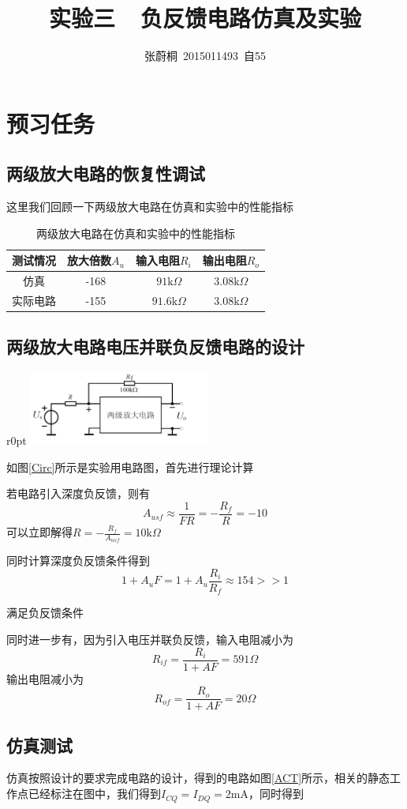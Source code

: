 \documentclass[UTF8,a4paper]{ctexart}
\title{实验三\ \ 负反馈电路仿真及实验}
\author{张蔚桐\ 2015011493\ 自55}
\begin{document}
\maketitle
\section{预习任务}
\subsection{两级放大电路的恢复性调试}
这里我们回顾一下两级放大电路在仿真和实验中的性能指标

\begin{table}
\centering
\caption{两级放大电路在仿真和实验中的性能指标}
\begin{tabular}{|c|c|c|c|}
\hline 
测试情况 & 放大倍数$A_u$ & 输入电阻$R_i$ & 输出电阻$R_o$\\
\hline 
仿真 & -168 &　$91\mathrm{k}\Omega$ & $3.08\mathrm{k}\Omega$ \\
\hline 
实际电路 & -155 &　$91.6\mathrm{k}\Omega$ & $3.08\mathrm{k}\Omega$ \\
\hline 
\end{tabular}
\end{table}
\subsection{两级放大电路电压并联负反馈电路的设计}
\begin {wrapfigure}{r}{0pt}
\includegraphics [width=60mm]{circuit.png}
\caption{实验用电路图}
\label{Circ}
\end {wrapfigure}
如图\ref{Circ}所示是实验用电路图，首先进行理论计算

若电路引入深度负反馈，则有
$$ A_{usf}\approx \frac{1}{FR}=-\frac{R_f}{R}=-10$$
可以立即解得$R=-\frac{R_f}{A_{usf}}=10\mathrm{k}\Omega$

同时计算深度负反馈条件得到
$$1+A_uF=1+A_u\frac{R_i}{R_f}\approx154 >>1$$

满足负反馈条件

同时进一步有，因为引入电压并联负反馈，输入电阻减小为
$$R_{if}=\frac{R_i}{1+AF}=591\Omega$$
输出电阻减小为
$$R_{of}=\frac{R_o}{1+AF}=20\Omega$$
\subsection{仿真测试}
仿真按照设计的要求完成电路的设计，得到的电路如图\ref{ACT}所示，相关的静态工作点已经标注在图中，我们得到$I_{CQ}=I_{DQ}=2\mathrm{mA}$，同时得到
\end{document}

